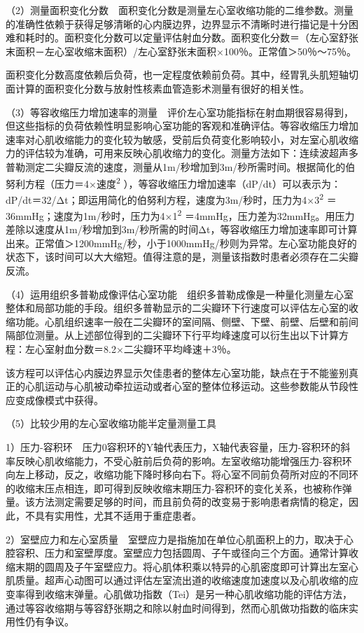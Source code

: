 （2）测量面积变化分数　面积变化分数是测量左心室收缩功能的二维参数。测量的准确性依赖于获得足够清晰的心内膜边界，边界显示不清晰时进行描记是十分困难和耗时的。面积变化分数可以定量评估射血分数。面积变化分数＝（左心室舒张末面积－左心室收缩末面积）/左心室舒张末面积×100％。正常值＞50％～75％。

面积变化分数高度依赖后负荷，也一定程度依赖前负荷。其中，经胃乳头肌短轴切面计算的面积变化分数与放射性核素血管造影术测量有很好的相关性。

（3）等容收缩压力增加速率的测量　评价左心室功能指标在射血期很容易得到，但这些指标的负荷依赖性明显影响心室功能的客观和准确评估。等容收缩压力增加速率对心肌收缩能力的变化较为敏感，受前后负荷变化影响较小，对左室心肌收缩力的评估较为准确，可用来反映心肌收缩力的变化。测量方法如下：连续波超声多普勒测定二尖瓣反流的速度，测量从1m/秒增加到3m/秒所需时间。根据简化的伯努利方程（压力＝4×速度\textsuperscript{2}
），等容收缩压力增加速率（dP/dt）可以表示为：dP/dt＝32/Δt；即运用简化的伯努利方程，速度为3m/秒时，压力为4×3\textsuperscript{2}
＝36mmHg；速度为1m/秒时，压力为4×1\textsuperscript{2}
＝4mmHg，压力差为32mmHg。用压力差除以速度从1m/秒增加到3m/秒所需的时间Δt，等容收缩压力增加速率即可计算出来。正常值＞1200mmHg/秒，小于1000mmHg/秒则为异常。左心室功能良好的状态下，该时间可以大大缩短。值得注意的是，测量该指数时患者必须存在二尖瓣反流。

（4）运用组织多普勒成像评估心室功能　组织多普勒成像是一种量化测量左心室整体和局部功能的手段。组织多普勒显示的二尖瓣环下行速度可以评估左心室的收缩功能。心肌组织速率一般在二尖瓣环的室间隔、侧壁、下壁、前壁、后壁和前间隔部位测量。从上述部位得到的二尖瓣环下行平均峰速度可以衍生出以下计算方程：左心室射血分数＝8.2×二尖瓣环平均峰速＋3％。

该方程可以评估心内膜边界显示欠佳患者的整体左心室功能，缺点在于不能鉴别真正的心肌运动与心肌被动牵拉运动或者心室的整体位移运动。这些参数能从节段性应变成像模式中获得。

（5）比较少用的左心室收缩功能半定量测量工具

1）压力-容积环　压力0容积环的Y轴代表压力，X轴代表容量，压力-容积环的斜率反映心肌收缩能力，不受心脏前后负荷的影响。左室收缩功能增强压力-容积环向左上移动，反之，收缩功能下降时移向右下。将心室不同前负荷所对应的不同环的收缩末压点相连，即可得到反映收缩末期压力-容积环的变化关系，也被称作弹量。该方法测定需要足够的时间，而且前负荷的改变易于影响患者病情的稳定，因此，不具有实用性，尤其不适用于重症患者。

2）室壁应力和左心室质量　室壁应力是指施加在单位心肌面积上的力，取决于心腔容积、压力和室壁厚度。室壁应力包括圆周、子午或径向三个方面。通常计算收缩末期的圆周及子午室壁应力。将心肌体积乘以特异的心肌密度即可计算出左室心肌质量。超声心动图可以通过评估左室流出道的收缩速度加速度以及心肌收缩的应变率得到收缩末弹量。心肌做功指数（Tei）是另一种心肌收缩功能的评估方法，通过等容收缩期与等容舒张期之和除以射血时间得到，然而心肌做功指数的临床实用性仍有争议。

